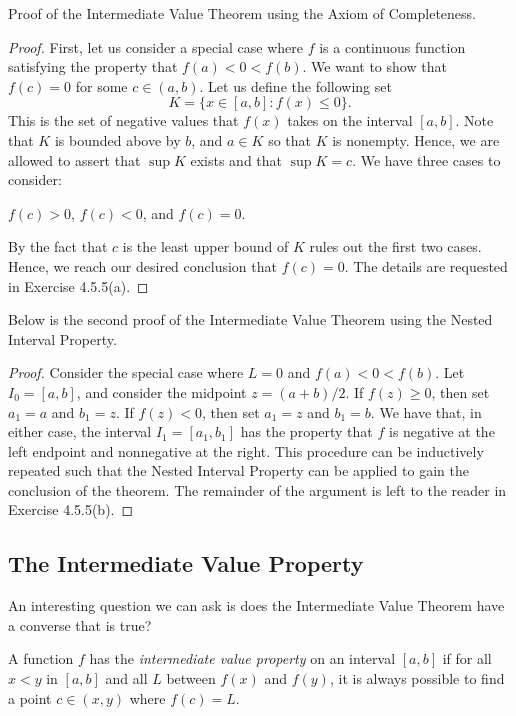 Proof of the Intermediate Value Theorem using the Axiom of Completeness.
\begin{proof}
First, let us consider a special case where \( f  \) is a continuous function satisfying the property that \( f(a) < 0 < f(b) \). We want to show that \( f(c) = 0  \) for some \( c \in (a,b) \). Let us define the following set 
\[  K = \{ x \in [a,b] : f(x) \leq 0  \}. \]
This is the set of negative values that \( f(x) \) takes on the interval \( [a,b] \). Note that \( K  \) is bounded above by \( b \), and \( a \in K  \) so that \(  K \) is nonempty. Hence, we are allowed to assert that \( \sup K  \) exists and that \( \sup K = c  \). We have three cases to consider: 
\begin{center}
    \( f(c) > 0  \), \( f(c) < 0  \), and \( f(c) = 0  \).
\end{center}
By the fact that \( c  \) is the least upper bound of \( K  \) rules out the first two cases. Hence, we reach our desired conclusion that \( f(c) = 0  \). The details are requested in Exercise 4.5.5(a).
\end{proof}

Below is the second proof of the Intermediate Value Theorem using the Nested Interval Property.

\begin{proof}
    Consider the special case where \( L = 0  \) and \( f(a) < 0 < f(b) \). Let \( I_0 = [a,b] \), and consider the midpoint \( z = (a+b)/ 2  \). If \( f(z) \geq 0  \), then set \( a_1 = a  \) and \( b_1 = z  \). If \( f(z) < 0  \), then set \( a_1 = z  \) and \( b_1 = b  \). We have that, in either case, the interval \( I_1 =  [a_1, b_1 ] \) has the property that \( f  \) is negative at the left endpoint and nonnegative at the right. This procedure can be inductively repeated such that the Nested Interval Property can be applied to gain the conclusion of the theorem. The remainder of the argument is left to the reader in Exercise 4.5.5(b).
\end{proof}

\subsection{The Intermediate Value Property} 

An interesting question we can ask is does the Intermediate Value Theorem have a converse that is true?

\begin{tcolorbox}
\begin{defn}
    A function \( f  \) has the \textit{intermediate value property} on an interval \( [a,b] \) if for all \( x < y  \) in \( [a,b] \) and all \( L   \) between \( f(x)  \) and \( f(y) \), it is always possible to find a point \( c \in (x,y) \) where \( f(c) = L  \).
\end{defn}
\end{tcolorbox}

